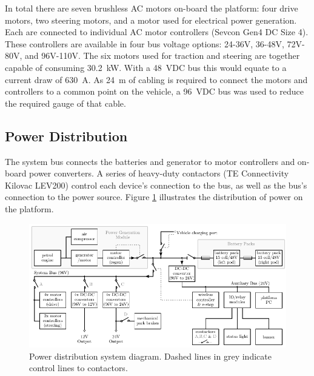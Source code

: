 \documentclass[preprint,authoryear,12pt]{elsarticle}
\begin{document}

        In total there are seven brushless AC motors on-board the platform: four drive motors, two steering motors, and a motor used for electrical power generation.
        Each are connected to individual AC motor controllers (Sevcon Gen4 DC Size 4).
        These controllers are available in four bus voltage options: 24-36V, 36-48V, 72V-80V, and 96V-110V.
        The six motors used for traction and steering are together capable of consuming \SI{30.2}{\kilo\watt}.
        With a \SI{48}{\volt}DC bus this would equate to a current draw of \SI{630}{\ampere}.
        As \SI{24}{\meter} of cabling is required to connect the motors and controllers to a common point on the vehicle, a \SI{96}{\volt}DC bus was used to reduce the required gauge of that cable.


    \subsection{Power Distribution}
    \label{sub:power}
        The system bus connects the batteries and generator to motor controllers and on-board power converters.
        A series of heavy-duty contactors (TE Connectivity Kilovac LEV200) control each device's connection to the bus, as well as the bus's connection to the power source.
        Figure \ref{fig:power_system_diagram} illustrates the distribution of power on the platform.

        \begin{figure}[htb]
            \centering
            \includegraphics[width=\linewidth]{imgs/system_diagram/full-system-diagram_v1.pdf}
            \caption{Power distribution system diagram. Dashed lines in grey indicate control lines to contactors.}
            \label{fig:power_system_diagram}
        \end{figure}
\end{document}
